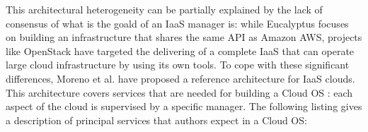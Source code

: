 This architectural heterogeneity can be partially explained by the lack of 
consensus of what is the goald of an IaaS manager is: while Eucalyptus focuses
on building an infrastructure that shares the same API as Amazon AWS, projects 
like OpenStack have targeted the delivering of a complete IaaS that can operate
large cloud infrastructure by using its own tools. To cope with these 
significant differences, Moreno et al. have proposed a reference architecture 
\cite{moreno2012iaas} for IaaS clouds. This architecture covers services that 
are needed for building a Cloud OS : each aspect of the cloud is supervised by a 
specific manager. The following listing gives a description of principal
services that authors expect in a Cloud OS:
